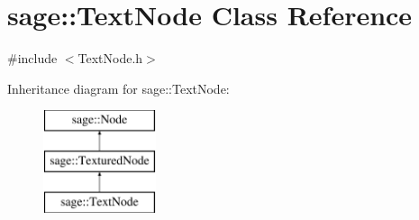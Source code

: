 \hypertarget{classsage_1_1TextNode}{}\section{sage\+::Text\+Node Class Reference}
\label{classsage_1_1TextNode}


{\ttfamily \#include $<$Text\+Node.\+h$>$}

Inheritance diagram for sage\+::Text\+Node\+:\begin{figure}[H]
\begin{center}
\leavevmode
\includegraphics[height=3.000000cm]{classsage_1_1TextNode}
\end{center}
\end{figure}
